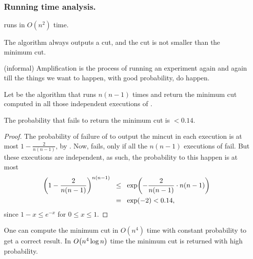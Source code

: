 \subsubsection{Running time analysis.}

\begin{observation}
    \MinCut{} runs in $O( n^{2} )$ time.
\end{observation}

\begin{observation}
    The algorithm always outputs a cut, and the cut is not smaller
    than the minimum cut.
\end{observation}

\begin{defn}
    (informal) Amplification is the process of running an experiment
    again and again till the things we want to happen, with good
    probability, do happen.
\end{defn}

Let \MinCutRep{} be the algorithm that runs \MinCut{} $n(n-1)$ times
and return the minimum cut computed in all those independent
executions of \MinCut{}.

\begin{lemma}
    The probability that \MinCutRep{} fails to return the minimum cut
    is $< 0.14$.
    
\end{lemma}
\begin{proof}
    The probability of failure of \MinCut to output the mincut in each
    execution is at most $1-\frac{2}{n( n-1)}$, by
    . Now, \MinCutRep fails, only if all the $n
    (n-1)$ executions of \MinCut fail. But these executions are
    independent, as such, the probability to this happen is at most
    \begin{align*}
        \pth{1-\frac{2}{n
              (n-1)}}^{n(n-1)}%
        &\LEQ%
        \exp\pth{-\frac{2}{n(n-1)}\cdot
           n(n-1)}
        \\&
        \EQ%
        \exp(-2)<0.14,
    \end{align*}
    since $1-x\leq e^{-x}$ for $0\leq x\leq 1$.
\end{proof}

\begin{theorem}   
    One can compute the minimum cut in $O(n^{4})$ time with constant
    probability to get a correct result. In $O\pth{n^{4}\log n}$ time
    the minimum cut is returned with high probability.
\end{theorem}

